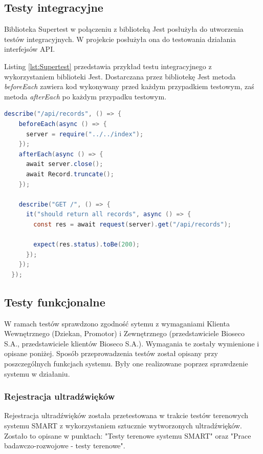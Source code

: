 \documentclass{sprz}
\begin{document}
\subsection{Testy integracyjne}

Biblioteka Supertest w połączeniu z biblioteką Jest posłużyła do utworzenia testów integracyjnych. W projekcie posłużyła ona do testowania działania interfejsów API.

Listing \ref{lst:Supertest} przedstawia przykład testu integracyjnego z wykorzystaniem biblioteki Jest. Dostarczana przez bibliotekę Jest metoda \textit{beforeEach} zawiera kod wykonywany przed każdym przypadkiem testowym, zaś metoda \textit{afterEach} po każdym przypadku testowym.

\begin{lstlisting}[language=Java,caption={Test integracyjny z wykorzystaniem Supertest i Jest}, label={lst:Supertest}]
  describe("/api/records", () => {
    beforeEach(async () => {
      server = require("../../index");
    });
    afterEach(async () => {
      await server.close();
      await Record.truncate();
    });
  
    describe("GET /", () => {
      it("should return all records", async () => {
        const res = await request(server).get("/api/records");
  
        expect(res.status).toBe(200);
      });
    });
  });
\end{lstlisting}

\subsection{Testy funkcjonalne}
W ramach testów sprawdzono zgodność sytemu z wymaganiami Klienta Wewnętrznego (Dziekan, Promotor) i Zewnętrznego (przedstawiciele Bioseco S.A., przedstawiciele klientów Bioseco S.A.). Wymagania te zostały wymienione i opisane poniżej. Sposób przeprowadzenia testów został opisany przy poszczególnych funkcjach systemu. Były one realizowane poprzez sprawdzenie systemu w działaniu.

\subsubsection{Rejestracja ultradźwięków}
Rejestracja ultradźwięków została przetestowana w trakcie testów terenowych systemu SMART z wykorzystaniem sztucznie wytworzonych ultradźwięków. Zostało to opisane w punktach: "Testy terenowe systemu SMART" oraz "Prace badawczo-rozwojowe - testy terenowe". 
\end{document}
